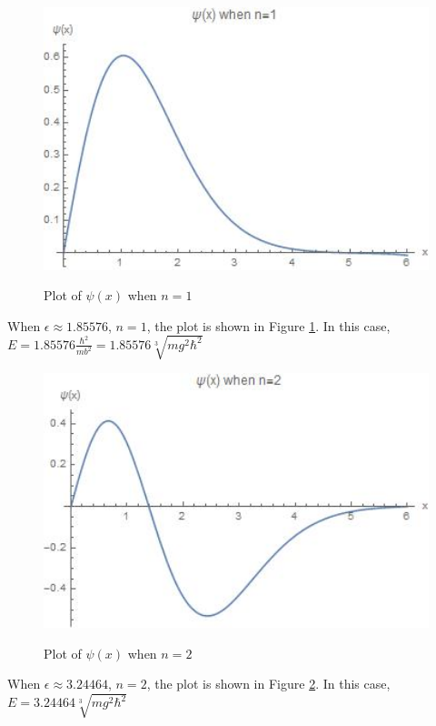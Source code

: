 \documentclass[12pt]{article}
\begin{document}
\begin{spacing}{2.0}
\begin{figure}
  \centering
  \includegraphics[width=5in]{out3}\\
  \caption{Plot of $\psi(x)$ when $n=1$ }\label{out3}
\end{figure}

When $\epsilon \approx 1.85576$, $n=1$, the plot is shown in Figure \ref{out3}. In this case, $E=1.85576 \frac{\hbar^2}{mb^2} = 1.85576 \sqrt[3]{mg^2 \hbar^2}$

\begin{figure}
  \centering
  \includegraphics[width=5in]{out4}\\
  \caption{Plot of $\psi(x)$ when $n=2$ }\label{out4}
\end{figure}

When $\epsilon \approx 3.24464$, $n=2$, the plot is shown in Figure \ref{out4}. In this case, $E= 3.24464 \sqrt[3]{mg^2 \hbar^2}$


\end{spacing}
\end{document}
